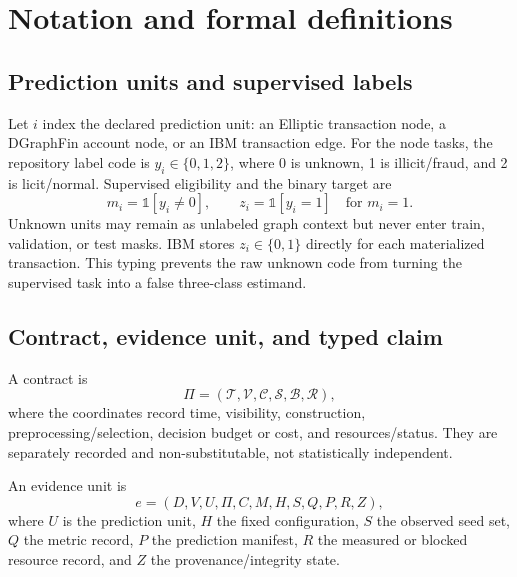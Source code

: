 \section{Notation and formal definitions}
\label{sec:s-notation}

\subsection{Prediction units and supervised labels}

Let \(i\) index the declared prediction unit: an Elliptic transaction node, a DGraphFin account node, or an IBM transaction edge. For the node tasks, the repository label code is \(y_i\in\{0,1,2\}\), where 0 is unknown, 1 is illicit/fraud, and 2 is licit/normal. Supervised eligibility and the binary target are
\begin{equation}
 m_i=\mathbb{1}[y_i\neq0],
 \qquad
 z_i=\mathbb{1}[y_i=1]\quad\text{for }m_i=1.
\end{equation}
Unknown units may remain as unlabeled graph context but never enter train, validation, or test masks. IBM stores \(z_i\in\{0,1\}\) directly for each materialized transaction. This typing prevents the raw unknown code from turning the supervised task into a false three-class estimand.

\subsection{Contract, evidence unit, and typed claim}

\begin{definition}
A contract is
\begin{equation}
 \Pi=(\mathcal{T},\mathcal{V},\mathcal{C},\mathcal{S},\mathcal{B},\mathcal{R}),
\end{equation}
where the coordinates record time, visibility, construction, preprocessing/selection, decision budget or cost, and resources/status. They are separately recorded and non-substitutable, not statistically independent.
\end{definition}

\begin{definition}
An evidence unit is
\begin{equation}
 e=(D,V,U,\Pi,C,M,H,S,Q,P,R,Z),
\end{equation}
where \(U\) is the prediction unit, \(H\) the fixed configuration, \(S\) the observed seed set, \(Q\) the metric record, \(P\) the prediction manifest, \(R\) the measured or blocked resource record, and \(Z\) the provenance/integrity state.
\end{definition}

